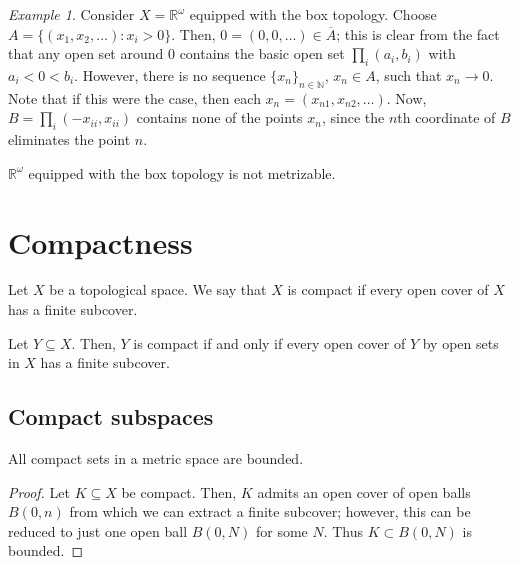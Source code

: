 \documentclass[11pt]{article}
\newcommand{\R}{\mathbb{R}}
\newcommand{\N}{\mathbb{N}}
\theoremstyle{definition}
\theoremstyle{remark}
\newtheorem*{example}{Example}
\numberwithin{equation}{section}
\begin{document}
    \begin{example}
        Consider $X = \R^\omega$ equipped with the box topology. Choose $A = \{(x_1,
        x_2, \dots): x_i > 0\}$. Then, $0 = (0, 0, \dots) \in \overline{A}$; this is
        clear from the fact that any open set around $0$ contains the basic open set
        $\prod_i (a_i, b_i)$ with $a_i < 0 < b_i$. However, there is no sequence
        $\{x_n\}_{n \in \N}$, $x_n \in A$, such that $x_n \to 0$. Note that if this
        were the case, then each $x_n = (x_{n1}, x_{n2}, \dots)$. Now, $B = \prod_i
        (-x_{ii}, x_{ii})$ contains none of the points $x_n$, since the $n$th
        coordinate of $B$ eliminates the point $n$. \\
    \end{example}
    \begin{corollary}
        $\R^\omega$ equipped with the box topology is not metrizable.
    \end{corollary}


    \section{Compactness}
    
    \begin{definition}
        Let $X$ be a topological space. We say that $X$ is compact if every open
        cover of $X$ has a finite subcover.
    \end{definition}

    \begin{lemma}
        Let $Y \subseteq X$. Then, $Y$ is compact if and only if every open cover of
        $Y$ by open sets in $X$ has a finite subcover.
    \end{lemma}


    \subsection{Compact subspaces}
    
    \begin{lemma}
        All compact sets in a metric space are bounded.
    \end{lemma}
    \begin{proof}
        Let $K \subseteq X$ be compact. Then, $K$ admits an open cover of open balls
        $B(0, n)$ from which we can extract a finite subcover; however, this can be
        reduced to just one open ball $B(0, N)$ for some $N$. Thus $K \subset B(0,
        N)$ is bounded.
    \end{proof}
\end{document}

